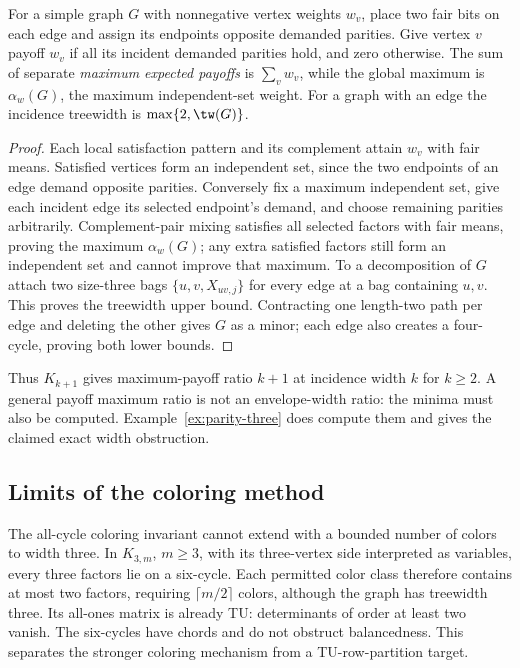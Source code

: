 \begin{proposition}\label{prop:independent-payoffs}
For a simple graph $G$ with nonnegative vertex weights $w_v$, place two
fair bits on each edge and assign its endpoints opposite demanded
parities. Give vertex $v$ payoff $w_v$ if all its incident demanded
parities hold, and zero otherwise. The sum of separate \emph{maximum
expected payoffs} is $\sum_vw_v$, while the global maximum is
$\alpha_w(G)$, the maximum independent-set weight. For a graph with
an edge the incidence treewidth is $\max\{2,\tw(G)\}$.
\end{proposition}
\begin{proof}
Each local satisfaction pattern and its complement attain $w_v$ with
fair means. Satisfied vertices form an independent set, since the two
endpoints of an edge demand opposite parities. Conversely fix a maximum
independent set, give each incident edge its selected endpoint's demand,
and choose remaining parities arbitrarily. Complement-pair mixing
satisfies all selected factors with fair means, proving the maximum
$\alpha_w(G)$; any extra satisfied factors still form an independent
set and cannot improve that maximum.
To a decomposition of $G$ attach two size-three bags $\{u,v,X_{uv,j}\}$
for every edge at a bag containing $u,v$. This proves the treewidth
upper bound. Contracting one length-two path per edge and deleting
the other gives $G$ as a minor; each edge also creates a four-cycle,
proving both lower bounds.
\end{proof}
Thus $K_{k+1}$ gives maximum-payoff ratio $k+1$ at incidence width $k$
for $k\ge2$. A general payoff maximum ratio is not an envelope-width
ratio: the minima must also be computed. Example~\ref{ex:parity-three}
does compute them and gives the claimed exact width obstruction.

\subsection{Limits of the coloring method}\label{subsec:width-three-boundary}
The all-cycle coloring invariant cannot extend with a bounded number
of colors to width three. In $K_{3,m}$, $m\ge3$, with its three-vertex
side interpreted as variables, every three factors lie on a six-cycle.
Each permitted color class therefore contains at most two factors,
requiring $\lceil m/2\rceil$ colors, although the graph has treewidth
three. Its all-ones matrix is already TU: determinants of order at
least two vanish. The six-cycles have chords and do not obstruct
balancedness. This separates the stronger coloring mechanism from a
TU-row-partition target.

